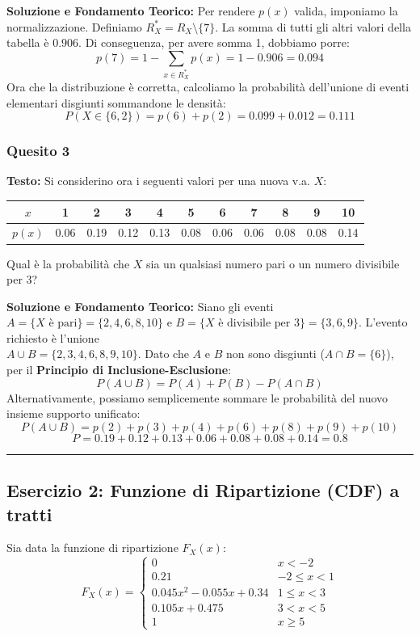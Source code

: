 \documentclass[12pt, a4paper]{article}
\begin{document}
\textbf{Soluzione e Fondamento Teorico:} 
Per rendere $p(x)$ valida, imponiamo la normalizzazione. Definiamo $R^*_X = R_X \setminus \{7\}$. La somma di tutti gli altri valori della tabella è $0.906$. Di conseguenza, per avere somma 1, dobbiamo porre:
$$ p(7) = 1 - \sum_{x \in R^*_X} p(x) = 1 - 0.906 = 0.094 $$
Ora che la distribuzione è corretta, calcoliamo la probabilità dell'unione di eventi elementari disgiunti sommandone le densità:
$$ P(X \in \{6,2\}) = p(6) + p(2) = 0.099 + 0.012 = 0.111 $$

\subsubsection*{Quesito 3}
\textbf{Testo:} Si considerino ora i seguenti valori per una nuova v.a. $X$:
\begin{center}
\begin{tabular}{c|cccccccccc}
\toprule
$x$ & 1 & 2 & 3 & 4 & 5 & 6 & 7 & 8 & 9 & 10 \\
\midrule
$p(x)$ & 0.06 & 0.19 & 0.12 & 0.13 & 0.08 & 0.06 & 0.06 & 0.08 & 0.08 & 0.14 \\
\bottomrule
\end{tabular}
\end{center}
Qual è la probabilità che $X$ sia un qualsiasi numero pari o un numero divisibile per 3?

\textbf{Soluzione e Fondamento Teorico:} 
Siano gli eventi $A = \{X \text{ è pari}\} = \{2,4,6,8,10\}$ e $B = \{X \text{ è divisibile per 3}\} = \{3,6,9\}$.
L'evento richiesto è l'unione \\ $A \cup B = \{2,3,4,6,8,9,10\}$. Dato che $A$ e $B$ non sono disgiunti ($A \cap B = \{6\}$), per il \textbf{Principio di Inclusione-Esclusione}:
$$ P(A \cup B) = P(A) + P(B) - P(A \cap B) $$
Alternativamente, possiamo semplicemente sommare le probabilità del nuovo insieme supporto unificato:
$$ P(A \cup B) = p(2)+p(3)+p(4)+p(6)+p(8)+p(9)+p(10) $$
$$ P = 0.19 + 0.12 + 0.13 + 0.06 + 0.08 + 0.08 + 0.14 = 0.8 $$

\vspace{0.5cm}\hrule\vspace{0.5cm}

\subsection*{Esercizio 2: Funzione di Ripartizione (CDF) a tratti}
Sia data la funzione di ripartizione $F_X(x)$:
$$
F_X(x) = 
\begin{cases} 
0 & x < -2 \\
0.21 & -2 \le x < 1 \\
0.045x^2 - 0.055x + 0.34 & 1 \le x < 3 \\
0.105x + 0.475 & 3 < x < 5 \\
1 & x \ge 5
\end{cases}
$$
\end{document}
